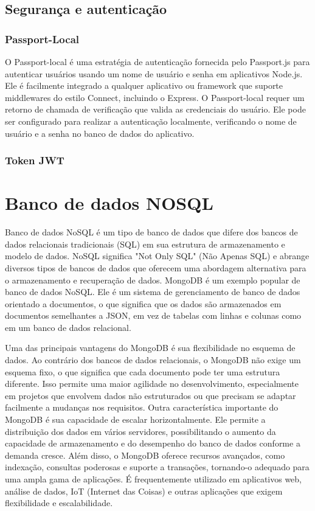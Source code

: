 \subsection{Segurança e autenticação}

\subsubsection{Passport-Local}
O Passport-local é uma estratégia de autenticação fornecida pelo Passport.js para autenticar usuários usando um nome de usuário e senha em aplicativos Node.js. Ele é facilmente integrado a qualquer aplicativo ou framework que suporte middlewares do estilo Connect, incluindo o Express. O Passport-local requer um retorno de chamada de verificação que valida as credenciais do usuário. Ele pode ser configurado para realizar a autenticação localmente, verificando o nome de usuário e a senha no banco de dados do aplicativo. 

\subsubsection{Token JWT}


\section{Banco de dados NOSQL}
Banco de dados NoSQL é um tipo de banco de dados que difere dos bancos de dados relacionais tradicionais (SQL) em sua estrutura de armazenamento e modelo de dados. NoSQL significa "Not Only SQL" (Não Apenas SQL) e abrange diversos tipos de bancos de dados que oferecem uma abordagem alternativa para o armazenamento e recuperação de dados.
MongoDB é um exemplo popular de banco de dados NoSQL. Ele é um sistema de gerenciamento de banco de dados orientado a documentos, o que significa que os dados são armazenados em documentos semelhantes a JSON, em vez de tabelas com linhas e colunas como em um banco de dados relacional.

Uma das principais vantagens do MongoDB é sua flexibilidade no esquema de dados. Ao contrário dos bancos de dados relacionais, o MongoDB não exige um esquema fixo, o que significa que cada documento pode ter uma estrutura diferente. Isso permite uma maior agilidade no desenvolvimento, especialmente em projetos que envolvem dados não estruturados ou que precisam se adaptar facilmente a mudanças nos requisitos.
Outra característica importante do MongoDB é sua capacidade de escalar horizontalmente. Ele permite a distribuição dos dados em vários servidores, possibilitando o aumento da capacidade de armazenamento e do desempenho do banco de dados conforme a demanda cresce.
Além disso, o MongoDB oferece recursos avançados, como indexação, consultas poderosas e suporte a transações, tornando-o adequado para uma ampla gama de aplicações. É frequentemente utilizado em aplicativos web, análise de dados, IoT (Internet das Coisas) e outras aplicações que exigem flexibilidade e escalabilidade.

